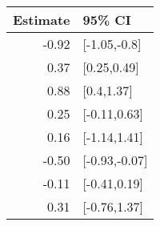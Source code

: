 \begin{tabular}{rl}
  \hline
Estimate & 95\% CI \\ 
  \hline
-0.92 & [-1.05,-0.8] \\ 
  0.37 & [0.25,0.49] \\ 
  0.88 & [0.4,1.37] \\ 
  0.25 & [-0.11,0.63] \\ 
  0.16 & [-1.14,1.41] \\ 
  -0.50 & [-0.93,-0.07] \\ 
  -0.11 & [-0.41,0.19] \\ 
  0.31 & [-0.76,1.37] \\ 
   \hline
\end{tabular}

